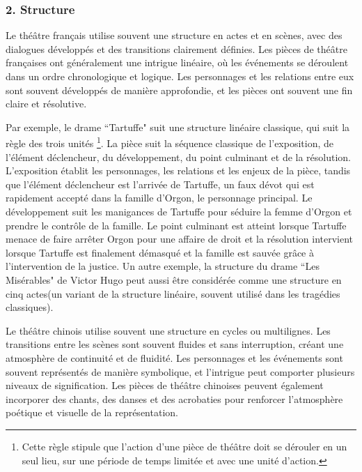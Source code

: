 \documentclass[UTF8,a4paper,12pt]{ctexart}
\numberwithin{equation}{section}
\newcommand{\mycite}[1]{\cite{#1}}
\begin{document}
\subsubsection*{2. Structure}
Le théâtre français utilise souvent une structure en actes et en scènes, avec des dialogues développés et des transitions clairement définies. Les pièces de théâtre françaises ont généralement une intrigue linéaire, où les événements se déroulent dans un ordre chronologique et logique. Les personnages et les relations entre eux sont souvent développés de manière approfondie, et les pièces ont souvent une fin claire et résolutive.

Par exemple, le drame ``Tartuffe" suit une structure linéaire classique, qui suit la règle des trois unités \footnote{Cette règle stipule que l'action d'une pièce de théâtre doit se dérouler en un seul lieu, sur une période de temps limitée et avec une unité d'action.}. La pièce suit la séquence classique de l'exposition, de l'élément déclencheur, du développement, du point culminant et de la résolution. L'exposition établit les personnages, les relations et les enjeux de la pièce, tandis que l'élément déclencheur est l'arrivée de Tartuffe, un faux dévot qui est rapidement accepté dans la famille d'Orgon, le personnage principal\mycite{cardullo2009moliere}. Le développement suit les manigances de Tartuffe pour séduire la femme d'Orgon et prendre le contrôle de la famille. Le point culminant est atteint lorsque Tartuffe menace de faire arrêter Orgon pour une affaire de droit et la résolution intervient lorsque Tartuffe est finalement démasqué et la famille est sauvée grâce à l'intervention de la justice\mycite{lancaster1929history}.
Un autre exemple, la structure du drame ``Les Misérables" de Victor Hugo peut aussi être considérée comme une structure en cinq actes(un variant de la structure linéaire, souvent utilisé dans les tragédies classiques).

Le théâtre chinois utilise souvent une structure en cycles ou multilignes. Les transitions entre les scènes sont souvent fluides et sans interruption, créant une atmosphère de continuité et de fluidité. Les personnages et les événements sont souvent représentés de manière symbolique, et l'intrigue peut comporter plusieurs niveaux de signification. Les pièces de théâtre chinoises peuvent également incorporer des chants, des danses et des acrobaties pour renforcer l'atmosphère poétique et visuelle de la représentation.
\end{document}
